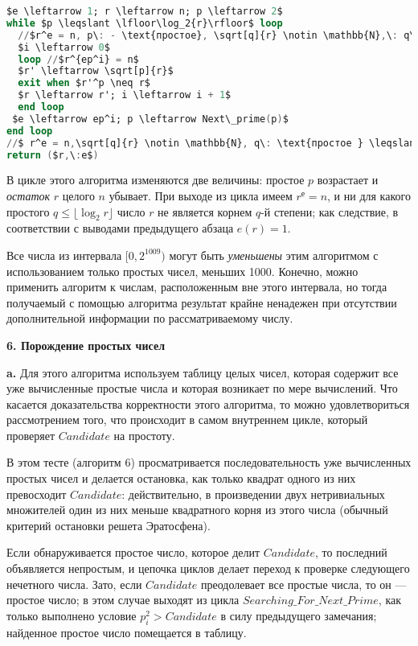 \begin{lstlisting}[mathescape=true, language=Ada, caption=Вычисление корня из целого числа]
$e \leftarrow 1; r \leftarrow n; p \leftarrow 2$
while $p \leqslant \lfloor\log_2{r}\rfloor$ loop
  //$r^e = n, p\: - \text{простое}, \sqrt[q]{r} \notin \mathbb{N},\: q\: \text{простое} < q$
  $i \leftarrow 0$
  loop //$r^{ep^i} = n$
  $r' \leftarrow \sqrt[p]{r}$
  exit when $r'^p \neq r$
  $r \leftarrow r'; i \leftarrow i + 1$
  end loop
 $e \leftarrow ep^i; p \leftarrow Next\_prime(p)$
end loop
//$ r^e = n,\sqrt[q]{r} \notin \mathbb{N}, q\: \text{простое } \leqslant\log_2{(r)},\: \text{значит}\: e(r) = 1$
return ($r,\:e$)
\end{lstlisting} 

В цикле этого алгоритма изменяются две величины: простое $p$ возрастает
и \textit{остаток} $r$ целого $n$ убывает. При выходе из цикла имеем $r^е = n$, и ни для
какого простого $q \leqslant \lfloor\log_2{r}\rfloor$ число $r$ не является корнем $q$-й степени; как следствие,
в соответствии с выводами предыдущего абзаца $e(r) = 1$.

Все числа из интервала $[0, 2^{1009})$ могут быть \textit{уменьшены} этим алгоритмом с использованием
только простых чисел, меньших 1000. Конечно, можно применить алгоритм к числам, расположенным
вне этого интервала, но тогда получаемый с помощью алгоритма результат крайне ненадежен при отсутствии
дополнительной информации по рассматриваемому числу.\newline

\noindent\textbf{6. Порождение простых чисел}\newline

\textbf{a.} Для этого алгоритма используем таблицу целых чисел, которая содержит
все уже вычисленные простые числа и которая возникает по мере вычислений.
Что касается доказательства корректности этого алгоритма, то можно удовлетвориться
рассмотрением того, что происходит в самом внутреннем цикле, который проверяет $Candidate$ на простоту.
\newpage

В этом тесте (алгоритм 6) просматривается последовательность уже вычисленных
простых чисел и делается остановка, как только квадрат одного из них превосходит $Candidate$:
действительно, в произведении двух нетривиальных множителей один из них меньше
квадратного корня из этого числа (обычный критерий остановки решета Эратосфена).

Если обнаруживается простое число, которое делит $Candidate$, то последний объявляется непростым,
и цепочка циклов делает переход к проверке следующего нечетного числа. Зато,
если $Candidate$ преодолевает все простые числа, то он — простое число; в этом случае
выходят из цикла $Searching\_For\_Next\_Prime$, как только выполнено условие $p^2_i > Candidate$
в силу предыдущего замечания; найденное простое число помещается в таблицу.

